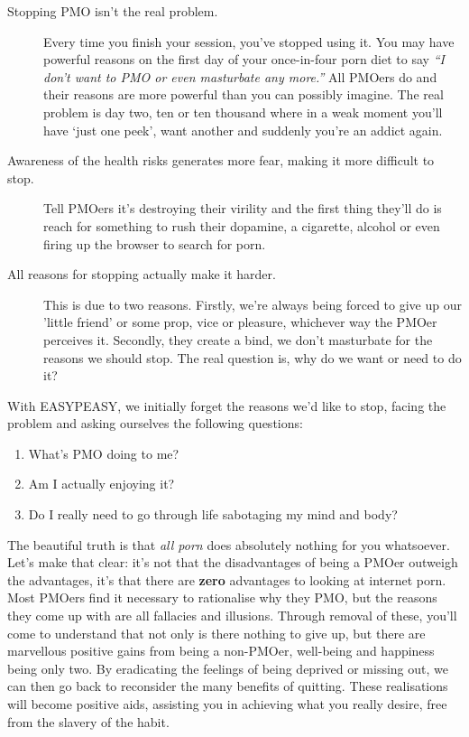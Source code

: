 \documentclass[easypeasy.tex]{subfiles}
\begin{document}
\begin{description}
  \item [Stopping PMO isn't the real problem.] Every time you finish your session, you've stopped using it. You may have powerful reasons on the first day of your once-in-four porn diet to say \textit{``I don't want to PMO or even masturbate any more.''} All PMOers do and their reasons are more powerful than you can possibly imagine. The real problem is day two, ten or ten thousand where in a weak moment you'll have `just one peek', want another and suddenly you're an addict again.

\item [Awareness of the health risks generates more fear, making it more difficult to stop.] Tell PMOers it's destroying their virility and the first thing they'll do is reach for something to rush their dopamine, a cigarette, alcohol or even firing up the browser to search for porn.

\item [All reasons for stopping actually make it harder.] This is due to two reasons. Firstly, we're always being forced to give up our 'little friend' or some prop, vice or pleasure, whichever way the PMOer perceives it. Secondly, they create a bind, we don't masturbate for the reasons we should stop. The real question is, why do we want or need to do it?
\end{description}

With EASYPEASY, we initially forget the reasons we'd like to stop, facing the problem and asking ourselves the following questions:

\begin{enumerate}
\item What's PMO doing to me?
\item Am I actually enjoying it?
\item Do I really need to go through life sabotaging my mind and body?
\end{enumerate}

The beautiful truth is that \textit{all porn} does absolutely nothing for you whatsoever. Let's make that clear: it's not that the disadvantages of being a PMOer outweigh the advantages, it's that there are \textbf{zero} advantages to looking at internet porn. Most PMOers find it necessary to rationalise why they PMO, but the reasons they come up with are all fallacies and illusions. Through removal of these, you'll come to understand that not only is there nothing to give up, but there are marvellous positive gains from being a non-PMOer, well-being and happiness being only two. By eradicating the feelings of being deprived or missing out, we can then go back to reconsider the many benefits of quitting. These realisations will become positive aids, assisting you in achieving what you really desire, free from the slavery of the habit.
\end{document}
